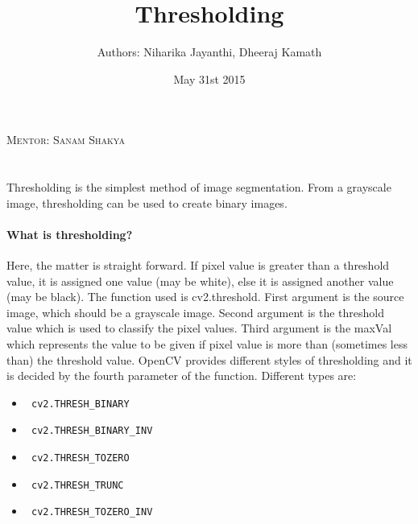 \documentclass{article}
\title{\Huge \sffamily Thresholding}
\author{\LARGE \sffamily Authors: Niharika Jayanthi, Dheeraj Kamath}
\date{ May 31st 2015}
\begin{document}
	\begin{titlepage}
		\maketitle
		\centering
		\textsc{\LARGE Mentor: Sanam Shakya}\\[1.5cm]
	\end{titlepage}
	 
	\begin{titlepage}
		\maketitle
	\end{titlepage}
	

\section*{\centering {\textcolor{blue}{\Huge Thresholding}}}
\Large \sffamily Thresholding is the simplest method of image segmentation. From a grayscale image, thresholding can be used to create binary images. 

\paragraph
{\sffamily \Large What is thresholding? \\ } 
Here, the matter is straight forward. If pixel value is greater than a threshold value, it is assigned one value (may be white), else it is assigned another value (may be black). The function used is cv2.threshold. First argument is the source image, which should be a grayscale image. Second argument is the threshold value which is used to classify the pixel values. Third argument is the maxVal which represents the value to be given if pixel value is more than (sometimes less than) the threshold value. OpenCV provides different styles of thresholding and it is decided by the fourth parameter of the function. Different types are:
\begin{itemize}
\item  \begin{verbatim} cv2.THRESH_BINARY \end{verbatim}
\item  \begin{verbatim} cv2.THRESH_BINARY_INV \end{verbatim}
\item  \begin{verbatim} cv2.THRESH_TOZERO \end{verbatim}
\item  \begin{verbatim} cv2.THRESH_TRUNC \end{verbatim}
\item  \begin{verbatim} cv2.THRESH_TOZERO_INV \end{verbatim}
\end{itemize}
\end{document}

